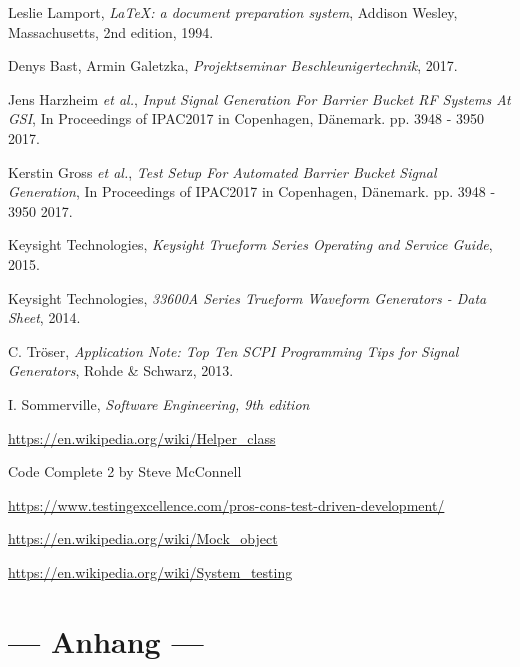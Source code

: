 \documentclass[../Report.tex]{subfiles}
\begin{document}


\begin{thebibliography}{9}

  Leslie Lamport,
  \textit{\LaTeX: a document preparation system},
  Addison Wesley, Massachusetts,
  2nd edition,
  1994.
  
	Denys Bast, Armin Galetzka, 
	\textit{Projektseminar Beschleunigertechnik},
	2017.
 
	Jens Harzheim \textit{et al.}, 
	\textit{Input Signal Generation For Barrier Bucket RF Systems At GSI}, In Proceedings of IPAC2017 in Copenhagen, Dänemark. 
	pp. 3948 - 3950
	2017.
	
	Kerstin Gross \textit{et al.},
	\textit{Test Setup For Automated Barrier Bucket Signal Generation},
	In Proceedings of IPAC2017 in Copenhagen, Dänemark. 
	pp. 3948 - 3950
	2017.
	
	Keysight Technologies,
	\textit{Keysight Trueform Series Operating and Service Guide},
	2015.

	Keysight Technologies,
	\textit{33600A Series Trueform Waveform Generators - Data Sheet},
	2014.
	
	C. Tröser, 
	\textit{Application Note: Top Ten SCPI Programming Tips for Signal Generators},
	Rohde \& Schwarz,
	2013.
	
	I. Sommerville,
	\textit{Software Engineering, 9th edition}
	
	\url{https://en.wikipedia.org/wiki/Helper_class}
	
	Code Complete 2 by Steve McConnell
	
	\url{https://www.testingexcellence.com/pros-cons-test-driven-development/}
	
	\url{https://en.wikipedia.org/wiki/Mock_object}
	
	\url{https://en.wikipedia.org/wiki/System_testing}	

\end{thebibliography}

\chapter{--- Anhang --- }
\label{chap:anhang}


\end{document}
